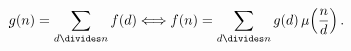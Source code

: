 \[g(n)=\sum_{d\divides n}f(d)\Longleftrightarrow f(n)=\sum_{d\divides n}g(d)%
\mathop{\mu\/}\nolimits\!\left(\frac{n}{d}\right).\]